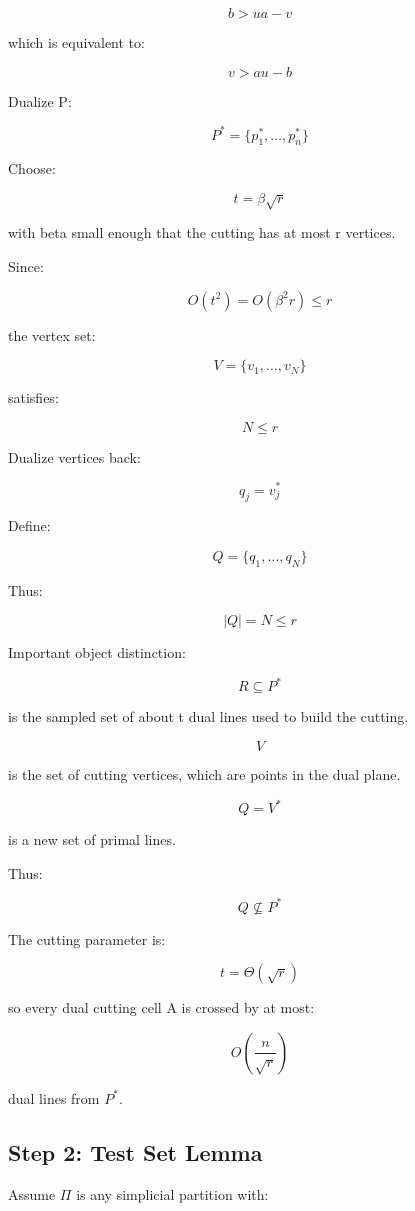 \documentclass[
  11pt,
]{article}
\begin{document}
\[
b>ua-v
\]

which is equivalent to:

\[
v>au-b
\]

Dualize P:

\[
P^\ast =\lbrace p_1^\ast ,\ldots,p_n^\ast  \rbrace
\]

Choose:

\[
t=\beta\sqrt r
\]

with beta small enough that the cutting has at most r vertices.

Since:

\[
O(t^2)=O(\beta^2r)\le r
\]

the vertex set:

\[
V=\lbrace v_1,\ldots,v_N \rbrace
\]

satisfies:

\[
N\le r
\]

Dualize vertices back:

\[
q_j=v_j^\ast 
\]

Define:

\[
Q=\lbrace q_1,\ldots,q_N \rbrace
\]

Thus:

\[
|Q|=N\le r
\]

Important object distinction:

\[
R\subseteq P^\ast 
\]

is the sampled set of about t dual lines used to build the cutting.

\[
V
\]

is the set of cutting vertices, which are points in the dual plane.

\[
Q=V^\ast 
\]

is a new set of primal lines.

Thus:

\[
Q\not\subseteq P^\ast 
\]

The cutting parameter is:

\[
t=\Theta(\sqrt r)
\]

so every dual cutting cell A is crossed by at most:

\[
O\left(\frac n{\sqrt r}\right)
\]

dual lines from \(P^*\).

\hypertarget{step-2-test-set-lemma}{%
\subsection{Step 2: Test Set Lemma}\label{step-2-test-set-lemma}}

Assume \(\Pi\) is any simplicial partition with:
\end{document}
